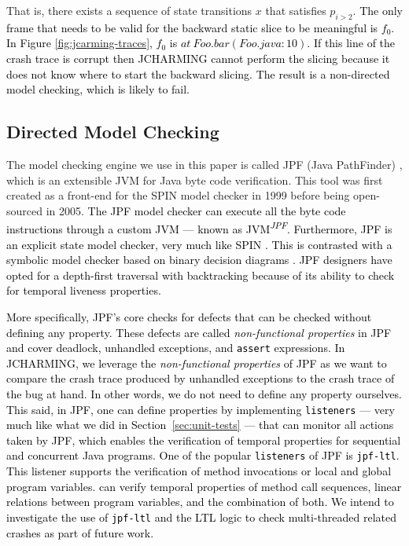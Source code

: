 \documentclass[times, doublespace]{smrauth}
\newcommand{\red}[1]{\textcolor{black}{#1}}
\begin{document}
{That is, there exists a sequence of state transitions $x$ that
satisfies $p_{i>2}$. \red{The only frame that
needs to be valid for the backward static slice to be
meaningful is $f_0$. In Figure \ref{fig:jcarming-traces}, $f_0$ is $at~ Foo.bar(Foo.java:10)$.
If this line of the crash trace is corrupt then JCHARMING cannot perform the slicing because it does not know where to start the backward slicing.
The result is a non-directed model checking, which is likely to fail.}

\subsection{Directed Model Checking}

The model checking engine we use in this paper is called JPF
(Java PathFinder) \cite{Visser2004}, which is an extensible JVM for Java
byte code verification. This tool was first created as a front-end
for the SPIN model checker \cite{holzmann1997model} in 1999 before being
open-sourced in 2005.
\red{The JPF model checker can execute all the byte code instructions through a custom JVM --- known as JVM\textsuperscript{\textit{JPF}}. Furthermore, JPF is an explicit state model checker,
very much like SPIN \cite{holzmann1997model}. This is contrasted with a symbolic model
checker based on binary decision diagrams \cite{mcmillan1993symbolic}.
JPF designers have opted for a depth-first traversal with backtracking  because of its ability to check for temporal liveness properties.}

\red{More specifically, JPF's core checks for defects that can be checked without defining any property.
These defects are called \textit{non-functional properties} in JPF and cover deadlock, unhandled exceptions, and \texttt{assert} expressions.
In JCHARMING, we leverage the \textit{non-functional properties} of JPF as we want to compare the crash trace produced by unhandled exceptions to the crash trace of the bug at hand. In other words, we do not need to define any property ourselves.
This said, in JPF, one can define properties by implementing \texttt{listeners} --- very much like what we did in Section~\ref{sec:unit-tests} --- that can monitor all actions taken by JPF, which enables the verification of temporal properties for sequential and concurrent Java programs.
One of the popular \texttt{listeners} of JPF is \texttt{jpf-ltl}.
This listener supports the verification of method invocations or local and global program variables. \textttt{jpf-ltl} can verify temporal properties of method call sequences, linear relations between program variables, and the combination of both.
We intend to investigate the use of \texttt{jpf-ltl} and the LTL logic to check multi-threaded related crashes as part of future work.}

}
\end{document}
